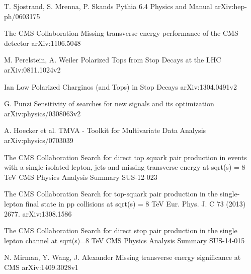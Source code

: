 \begin{thebibliography}{2}
             {T. Sjostrand, S. Mrenna, P. Skands}
             {Pythia 6.4 Physics and Manual}
             {arXiv:hep-ph/0603175}


             {The CMS Collaboration}
             {Missing transverse energy performance of the CMS detector}
             {arXiv:1106.5048}


             {M. Perelstein, A. Weiler}
             {Polarized Tops from Stop Decays at the LHC}
             {arXiv:0811.1024v2}

             {Ian Low}
             {Polarized Charginos (and Tops) in Stop Decays}
             {arXiv:1304.0491v2}


             {G. Punzi}
             {Sensitivity of searches for new signals and its optimization}
             {arXiv:physics/0308063v2}

             {A. Hoecker et al.}
             {TMVA - Toolkit for Multivariate Data Analysis}
             {arXiv:physics/0703039}


             {The CMS Collaboration}
             {Search for direct top squark pair production in events with a single isolated lepton, jets and missing transverse energy at sqrt(s) = 8 TeV}
             {CMS Physics Analysis Summary SUS-12-023}

             {The CMS Collaboration}
             {Search for top-squark pair production in the single-lepton final state in pp collisions at sqrt(s) = 8 TeV}
             {Eur. Phys. J. C 73 (2013) 2677. arXiv:1308.1586}

             {The CMS Collaboration}
             {Search for direct stop pair production in the single lepton channel at sqrt(s)=8 TeV}
             {CMS Physics Analysis Summary SUS-14-015}


             {N. Mirman, Y. Wang, J. Alexander}
             {Missing transverse energy significance at CMS}
             {arXiv:1409.3028v1}


\end{thebibliography}
